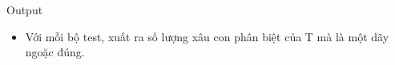 Output
\begin{itemize}
	\item     Với mỗi bộ test, xuất ra số lượng xâu con phân biệt của T mà là một dãy ngoặc đúng.   
\end{itemize}